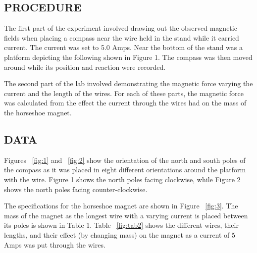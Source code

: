 \documentclass [12pt, letterpaper, twoside] {article}
\begin{document}
\subsection* {PROCEDURE}
The first part of the experiment involved drawing out the observed magnetic fields when placing a compass near the wire held in the stand while it carried current. The current was set to 5.0 Amps. Near the bottom of the stand was a platform depicting the following shown in Figure 1. The compass was then moved around while its position and reaction were recorded.

\noindent
The second part of the lab involved demonstrating the magnetic force varying the current and the length of the wires. For each of these parts, the magnetic force was calculated from the effect the current through the wires had on the mass of the horseshoe magnet.

\subsection* {DATA}
Figures ~\ref{fig:1} and ~\ref{fig:2} show the orientation of the north and south poles of the compass as it was placed in eight different orientations around the platform with the wire. Figure 1 shows the north poles facing clockwise, while Figure 2 shows the north poles facing counter-clockwise.

\noindent
The specifications for the horseshoe magnet are shown in Figure ~\ref{fig:3}. The mass of the magnet as the longest wire with a varying current is placed between its poles is shown in Table 1. Table ~\ref{fig:tab2} shows the different wires, their lengths, and their effect (by changing mass) on the magnet as a current of 5 Amps was put through the wires.
\end{document}
